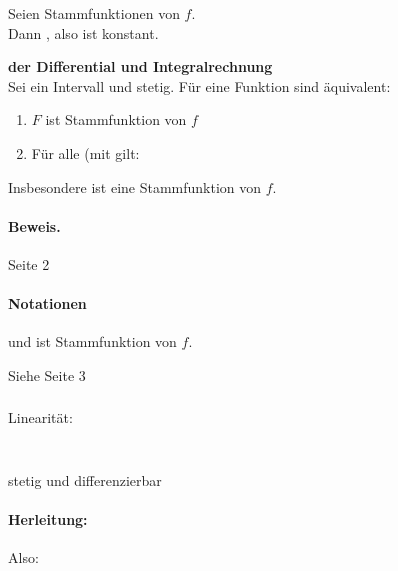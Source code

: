 \documentclass[9pt]{article} %
\begin{document}
\begin{bem}
Seien  Stammfunktionen von $f$. \\ 
Dann , also  ist konstant. 
\end{bem}

\begin{satz} \textbf{ der Differential und Integralrechnung} \\
Sei \ma{\isr} ein Intervall und  stetig. Für eine Funktion  sind äquivalent:
\begin{enumerate}
    \item $F$ ist Stammfunktion von $f$
    \item  Für alle  (mit  gilt: 
\end{enumerate}
Insbesondere ist  eine Stammfunktion von $f$.
\paragraph{Beweis.} Seite 2
\end{satz}

\paragraph{Notationen} \ma{[F(x))^b_a = F(b) - F(a)} und  ist Stammfunktion von $f.$

\begin{bsp}
Siehe Seite 3
\end{bsp}

\subsubsection{}
Linearität: 
\subsubsection{}  \\
 stetig und differenzierbar 
\paragraph{Herleitung:}   Also:  
\end{document}
